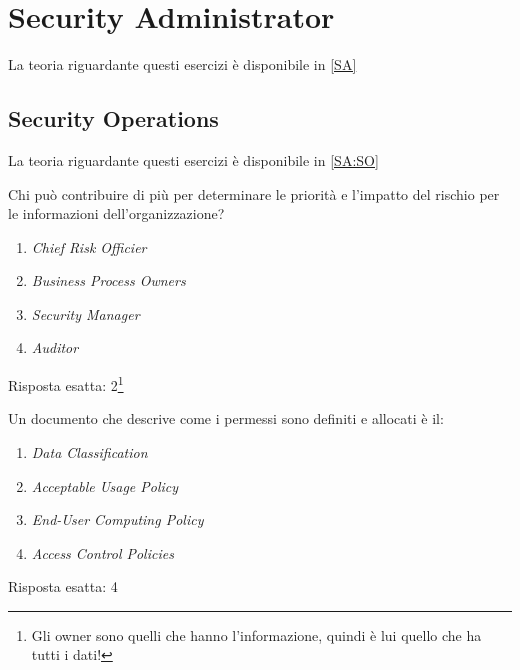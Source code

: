 \section{Security Administrator}
\label{es:SA}

La teoria riguardante questi esercizi è disponibile in \ref{SA}

\subsection{Security Operations}
\label{esSA:SO}

La teoria riguardante questi esercizi è disponibile in \ref{SA:SO}

\begin{Exercise} [
  title={Quiz},
  label={esSA1}
  ]

  \Question Chi può contribuire di più per determinare le priorità e l'impatto 
del rischio per le informazioni dell'organizzazione?
\begin{enumerate}
 \item \textit{Chief Risk Officier}
 \item \textit{Business Process Owners}
 \item \textit{Security Manager}
 \item \textit{Auditor}
\end{enumerate}

\end{Exercise}

\begin{Answer} [
  ref={esSA1},
  number={1}
  ]

  \Question Risposta esatta: 2\footnote{Gli owner sono quelli che hanno 
l'informazione, quindi è lui quello che ha tutti i dati!}
\end{Answer}


\begin{Exercise} [
  title={Quiz},
  label={esSA2}
  ]

  \Question Un documento che descrive come i permessi sono definiti e allocati 
è il:
\begin{enumerate}
 \item \textit{Data Classification}
 \item \textit{Acceptable Usage Policy}
 \item \textit{End-User Computing Policy}
 \item \textit{Access Control Policies}
\end{enumerate}
  
\end{Exercise}

\begin{Answer} [
  ref={esSA2},
  number={2}
  ]

  \Question Risposta esatta: 4
\end{Answer}
